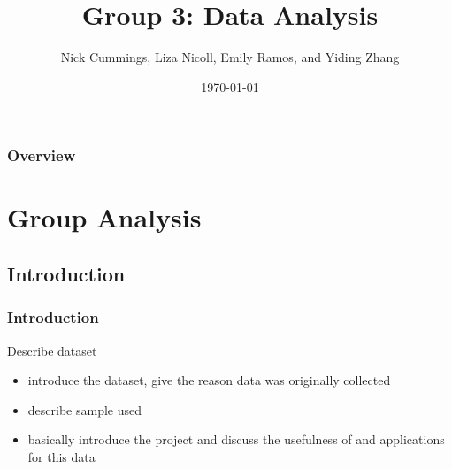 \documentclass{beamer}\usepackage[]{graphicx}\usepackage[]{color}
\title[Group3:Data Analysis]{Group 3: Data Analysis} %
\author[Emily, Nick, Liza and Yiding]{Nick Cummings, Liza Nicoll, Emily Ramos, and Yiding Zhang} %
\institute[UMASS] %
{
University of Massachusetts, Amherst \\ %
\medskip
}
\date{\today} %
\begin{document}
\begin{frame}
\titlepage %
\end{frame}

\begin{frame}
\frametitle{Overview} %
\tableofcontents %
\end{frame}


\section{Group Analysis} %

\subsection{Introduction} %

\begin{frame}
\frametitle{Introduction}

Describe dataset
\begin{itemize}
\item introduce the dataset, give the reason data was originally collected
\item describe sample used
\item basically introduce the project and discuss the usefulness of and applications for this data

\end{itemize}
\end{frame}
\end{document}
